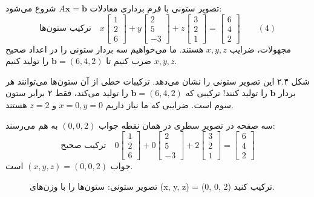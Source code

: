\documentclass[12pt, a4paper]{book}
\begin{document}
	تصویر ستونی با فرم برداری معادلات \( A\mathbf{x} = \mathbf{b} \) شروع می‌شود:
	\[
	\text{ترکیب ستون‌ها} \quad x\begin{bmatrix} 1 \\ 2 \\ 6 \end{bmatrix} + y\begin{bmatrix} 2 \\ 5 \\ -3 \end{bmatrix} + z\begin{bmatrix} 3 \\ 2 \\ 1 \end{bmatrix} = \begin{bmatrix} 6 \\ 4 \\ 2 \end{bmatrix} \quad\quad (4)
	\]
	مجهولات، ضرایب \( x, y, z \) هستند. ما می‌خواهیم سه بردار ستونی را در اعداد صحیح \( x, y, z \) ضرب کنیم تا \( \mathbf{b} = (6, 4, 2) \) را تولید کنیم.
	
	شکل ۲.۴ این تصویر ستونی را نشان می‌دهد. ترکیبات خطی از آن ستون‌ها می‌توانند هر بردار \( \mathbf{b} \) را تولید کنند! ترکیبی که \( \mathbf{b} = (6, 4, 2) \) را تولید می‌کند، فقط ۲ برابر ستون سوم است. ضرایبی که ما نیاز داریم \( x=0, y=0 \) و \( z=2 \) هستند.
	
	سه صفحه در تصویر سطری در همان نقطه جواب \( (0,0,2) \) به هم می‌رسند:
	\[
	\text{ترکیب صحیح} \quad 0\begin{bmatrix} 1 \\ 2 \\ 6 \end{bmatrix} + 0\begin{bmatrix} 2 \\ 5 \\ -3 \end{bmatrix} + 2\begin{bmatrix} 3 \\ 2 \\ 1 \end{bmatrix} = \begin{bmatrix} 6 \\ 4 \\ 2 \end{bmatrix}
	\]
	جواب \( (x,y,z) = (0,0,2) \) است.
	
	\begin{figure}[h!]
		\centering
		\caption{تصویر ستونی: ستون‌ها را با وزن‌های (x, y, z) = (0, 0, 2) ترکیب کنید.}
	\end{figure}
	
\end{document}
